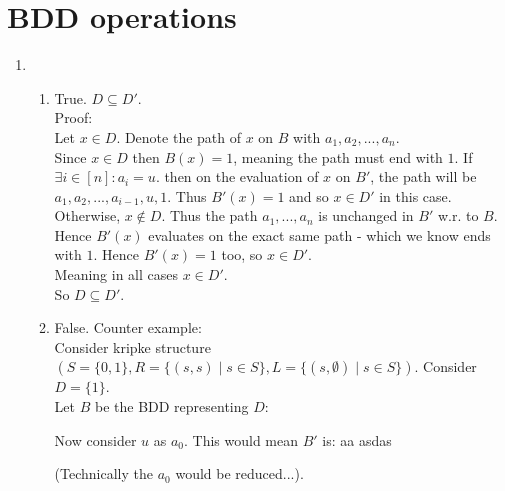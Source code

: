 \documentclass{article}
\begin{document}
\section{BDD operations}
\begin{enumerate}[label=\textbf{\alph*.}]
\item
    \begin{enumerate}[label=\textbf{\arabic*.}]
    \item True. $D\subseteq D'$.\\
        Proof:\\
        Let $x\in D$. Denote the path of $x$ on $B$ with $a_1,a_2,...,a_n$.\\
        Since $x\in D$ then $B(x)=1$, meaning the path must end with $1$.
        If $\exists i\in[n]: a_i=u$.
        then on the evaluation of $x$ on $B'$,
        the path will be $a_1,a_2,...,a_{i-1},u,1$.
        Thus $B'(x)=1$ and so $x\in D'$ in this case.\\
        Otherwise, $x\notin D$. Thus the path $a_1,...,a_n$ is
        unchanged in $B'$ w.r. to $B$. Hence $B'(x)$ evaluates
        on the exact same path - which we know ends with $1$.
        Hence $B'(x)=1$ too, so $x\in D'$.\\
        Meaning in all cases $x\in D'$.\\
        So $D\subseteq D'$.
    \item False. %
        Counter example:\\
        Consider kripke structure $(S=\{0,1\},R=\{(s,s)\mid s\in S\},L=\{(s,\emptyset)\mid s\in S\})$.
        Consider $D=\{1\}$.\\
        Let $B$ be the BDD representing $D$:\\
        \begin{center}\end{center}
        Now consider $u$ as $a_0$. This would mean $B'$ is: aa asdas
        \begin{center}\end{center}
        (Technically the $a_0$ would be reduced...).\\

\end{enumerate}
\end{enumerate}
\end{document}
